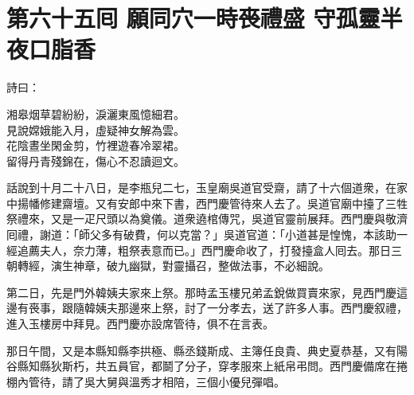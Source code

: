 
\chapter*{第六十五囘 願同穴一時䘮禮盛 守孤靈半夜口脂香}


詩曰：

\begin{myquote} 
湘皋烟草碧紛紛，淚灑東風憶細君。\\見說嫦娥能入月，虛疑神女解為雲。\\花陰晝坐閑金剪，竹裡遊春冷翠裙。\\留得丹青殘錦在，傷心不忍讀迴文。
\end{myquote} 

話說到十月二十八日，是李瓶兒二七，玉皇廟吳道官受齋，請了十六個道衆，在家中揚幡修建齋壇。又有安郎中來下書，西門慶管待來人去了。吳道官廟中擡了三牲祭禮來，又是一疋尺頭以為奠儀。道衆遶棺傳咒，吳道官靈前展拜。西門慶與敬濟囘禮，謝道：「師父多有破費，何以克當？」吳道官道：「小道甚是惶愧，本該助一經追薦夫人，奈力薄，粗祭表意而已。」西門慶命收了，打發擡盒人囘去。那日三朝轉經，演生神章，破九幽獄，對靈攝召，整做法事，不必細說。

第二日，先是門外韓姨夫家來上祭。那時孟玉樓兄弟孟銳做買賣來家，{}見西門慶這邊有䘮事，跟隨韓姨夫那邊來上祭，討了一分孝去，送了許多人事。西門慶叙禮，進入玉樓房中拜見。西門慶亦設席管待，俱不在言表。

那日午間，又是本縣知縣李拱極、縣丞錢斯成、主簿任良貴、典史夏恭基，又有陽谷縣知縣狄斯朽，共五員官，都鬬了分子，穿孝服來上紙帛弔問。西門慶備席在捲棚內管待，請了吳大舅與溫秀才相陪，三個小優兒彈唱。

